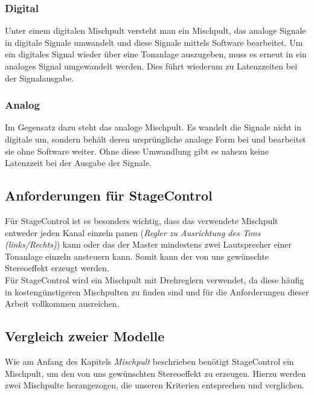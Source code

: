 \subsubsection{Digital}
Unter einem digitalen Mischpult versteht man ein Mischpult, das analoge Signale in digitale Signale umwandelt und diese Signale mittels Software bearbeitet. Um ein digitales Signal wieder über eine Tonanlage auszugeben, muss es erneut in ein analoges Signal umgewandelt werden. Dies führt wiederum zu Latenzzeiten bei der Signalausgabe.
\subsubsection{Analog}
Im Gegensatz dazu steht das analoge Mischpult. Es wandelt die Signale nicht in digitale um, sondern behält deren ursprüngliche analoge Form bei und bearbeitet sie ohne Software weiter. Ohne diese Umwandlung gibt es nahezu keine Latenzzeit bei der Ausgabe der Signale. \\
\textcite{MischpultAnalogDigital}

\subsection{Anforderungen für StageControl}
Für StageControl ist es besonders wichtig, dass das verwendete Mischpult entweder jeden Kanal einzeln panen (\emph{Regler zu Ausrichtung des Tons (links/Rechts)}) kann oder das der Master mindestens zwei Lautsprecher einer Tonanlage einzeln ansteuern kann. Somit kann der von uns gewünschte Stereoeffekt erzeugt werden. \\
Für StageControl wird ein Mischpult mit Drehreglern verwendet, da diese häufig in kostengünstigeren Mischpulten zu finden sind und für die Anforderungen dieser Arbeit vollkommen ausreichen. 



\subsection{Vergleich zweier Modelle}
Wie am Anfang des Kapitels \emph{Mischpult} beschrieben benötigt StageControl ein Mischpult, um den von uns gewünschten Stereoeffekt zu erzeugen. Hierzu werden zwei Mischpulte herangezogen, die unseren Kriterien entsprechen und  verglichen.

